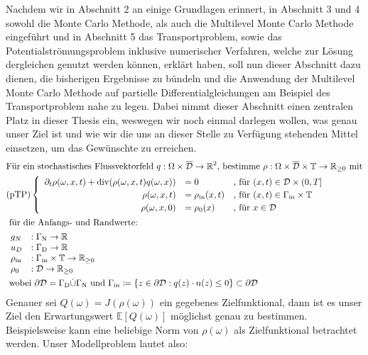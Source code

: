 Nachdem wir in Abschnitt 2 an einige Grundlagen erinnert, in Abschnitt 3 und 4 sowohl die Monte Carlo Methode, als auch die Multilevel Monte Carlo Methode eingeführt und in Abschnitt 5 das Transportproblem, sowie das Potentialströmungsproblem inklusive numerischer Verfahren, welche zur Lösung dergleichen genutzt werden können, erklärt haben, soll nun dieser Abschnitt dazu dienen, die bisherigen Ergebnisse zu bündeln und die Anwendung der Multilevel Monte Carlo Methode auf partielle Differentialgleichungen am Beispiel des Transportproblem nahe zu legen. Dabei nimmt dieser Abschnitt einen zentralen Platz in dieser Thesis ein, weswegen wir noch einmal darlegen wollen, was genau unser Ziel ist und wie wir die uns an dieser Stelle zu Verfügung stehenden Mittel einsetzen, um das Gewünschte zu erreichen.
\begin{align*}
&\text{Für ein stochastisches Flussvektorfeld } q: \Omega \times \overline{\mathcal{D}} \to \R^2 \text{, bestimme }\rho: \Omega \times \overline{\mathcal{D}} \times \mathbb{T} \to \R_{\geq 0} \text{ mit} \\
&\text{(pTP)} 
\begin{cases}
\begin{array}{rlll}
\partial_t \rho (\omega, x, t) + \dive(\rho(\omega,x,t)q(\omega,x)) &= 0 &\text{, für } (x,t) \in \mathcal{D} \times (0,T] \\
\rho(\omega,x,t) &= \rho_{\text{in}}(x,t) &\text{, für } (x,t) \in \Gamma_{\text{in}} \times \mathbb{T} \\
\rho(\omega,x,0)  &= \rho_0(x) &\text{, für } x \in  \mathcal{D}
\end{array}
\end{cases} \\
&\text{ für die Anfangs- und Randwerte: } \\ 
&\begin{array}{llr}
g_N&: \Gamma_{\text{N}} \to \R \\
u_D&: \Gamma_{\text{D}} \to \R \\
\rho_{\text{in}}&: \Gamma_{\text{in}} \times \mathbb{T} \to \R_{\geq0} \\
\rho_0&: \mathcal{D} \to \R_{\geq0} \\
\end{array} \newline \\
&\text{ wobei } \partial \mathcal{D} = \Gamma_{\text{D}} \dot{\cup} \Gamma_{\text{N}}  \text{ und }  \Gamma_{\text{in}} \coloneqq  \{ z \in \partial \mathcal{D}: q(z)\cdot n(z) \leq 0 \} \subset  \partial \mathcal{D}
\end{align*}
Genauer sei $ Q(\omega) = J(\rho(\omega)) $ ein gegebenes Zielfunktional, dann ist es unser Ziel den Erwartungswert $ \mathbb{E}[Q(\omega)] $ möglichst genau zu bestimmen. Beispielsweise kann eine beliebige Norm von $ \rho(\omega) $ als Zielfunktional betrachtet werden.
Unser Modellproblem lautet also:


